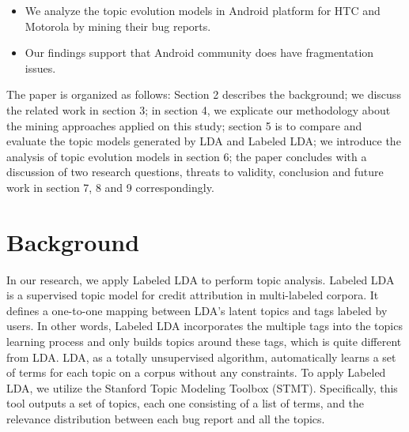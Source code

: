 \documentclass[10pt, conference, compsocconf]{IEEEtran}
\begin{document}
\begin{itemize}
\item We analyze the topic evolution models in Android platform for HTC and Motorola by mining their bug reports.
\end{itemize}

\begin{itemize}
\item Our findings support that Android community does have fragmentation issues.
\end{itemize}

The paper is organized as follows: Section 2 describes the background; we discuss the related work in section 3; in section 4, we explicate our methodology about the mining approaches applied on this study; section 5 is to compare and evaluate the topic models generated by LDA and Labeled LDA; we introduce the analysis of topic evolution models in section 6; the paper concludes with a discussion of two research questions, threats to validity, conclusion and future work in section 7, 8 and 9 correspondingly. 





\section{Background}
In our research, we apply Labeled LDA to perform topic analysis. Labeled LDA is a supervised topic model for credit attribution in multi-labeled corpora\cite{labeledlda}. It defines a one-to-one mapping between LDA’s latent topics and tags labeled by users. In other words, Labeled LDA incorporates the multiple tags into the topics learning process and only builds topics around these tags, which is quite different from LDA. LDA, as a totally unsupervised algorithm, automatically learns a set of terms for each topic on a corpus without any constraints. To apply Labeled LDA, we utilize the Stanford Topic Modeling Toolbox (STMT)\cite{stmt}. Specifically, this tool outputs a set of topics, each one consisting of a list of terms, and the relevance distribution between each bug report and all the topics.
\end{document}
